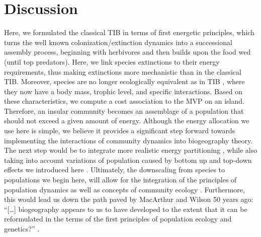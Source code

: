 \section{Discussion}\label{discussion}

Here, we formulated the classical TIB in terms of first energetic
principles, which turns the well known colonization/extinction dynamics
into a successional assembly process, beginning with herbivores and then
builds upon the food wed (until top predators). Here, we link species
extinctions to their energy requirements, thus making extinctions more
mechanistic than in the classical TIB. Moreover, species are no longer
ecologically equivalent as in TIB \citep{Lomolino2009}, where they now
have a body mass, trophic level, and specific interactions. Based on
these characteristics, we compute a cost association to the MVP on an
island. Therefore, an insular community becomes an assemblage of a
population that should not exceed a given amount of energy. Although the
energy allocation we use here is simple, we believe it provides a
significant step forward towards implementing the interactions of
community dynamics into biogeography theory. The next step would be to
integrate more realistic energy partitioning \citep{DeRuiter1995}, while
also taking into account variations of population caused by bottom up
and top-down effects we introduced here \citep{Terborgh2001, Brown2013}.
Ultimately, the downscaling from species to populations we begin here,
will allow for the integration of the principles of population dynamics
as well as concepts of community ecology \citep[\emph{i.e.}, stability
of a community][]{Allesina2012a}. Furthermore, this would lead us down
the path paved by MacArthur and Wilson 50 years ago: ``{[}\ldots{}{]}
biogeography appears to us to have developed to the extent that it can
be reformulated in the terms of the first principles of population
ecology and genetics?'' \citep[p.183]{MacArthur1967}.

